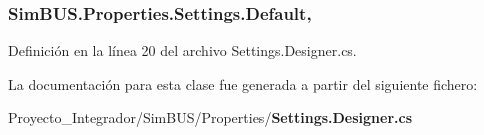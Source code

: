 \subsubsection[{Default}]{ Sim\-B\-U\-S.\-Properties.\-Settings.\-Default\hspace{0.3cm}{\ttfamily [static]}, {\ttfamily [get]}}\label{class_sim_b_u_s_1_1_properties_1_1_settings_a52b3274da466bd8984cc9a0be3e97dc0}


Definición en la línea 20 del archivo Settings.\-Designer.\-cs.



La documentación para esta clase fue generada a partir del siguiente fichero\-:\begin{DoxyCompactItemize}
\item 
Proyecto\-\_\-\-Integrador/\-Sim\-B\-U\-S/\-Properties/{\bf Settings.\-Designer.\-cs}\end{DoxyCompactItemize}

